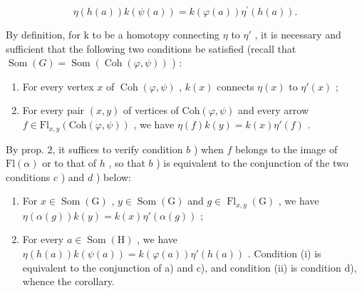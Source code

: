 \[
\eta (h (a)) k (\psi (a)) = k (\varphi (a)) \eta^ {\prime} (h (a)).
\]

By definition, for k to be a homotopy connecting \(\eta\) to \(\eta'\) , it is necessary and sufficient that the following two conditions be satisfied (recall that \(\operatorname{Som}(G) = \operatorname{Som}(\operatorname{Coh}(\varphi, \psi))\) ) :

\begin{enumerate}
\def\labelenumi{\alph{enumi})}
\item
  For every vertex \(x\) of \(\operatorname{Coh}(\varphi, \psi)\) , \(k(x)\) connects \(\eta(x)\) to \(\eta'(x)\) ;
\item
  For every pair \((x,y)\) of vertices of \(\mathrm{Coh}(\varphi,\psi)\) and every arrow \(f\in\mathrm{Fl}_{x,y}(\mathrm{Coh}(\varphi,\psi))\) , we have \(\eta(f)k(y)=k(x)\eta'(f)\) .
\end{enumerate}

By prop. 2, it suffices to verify condition \(b\) ) when \(f\) belongs to the image of \(\mathrm{Fl}(\alpha)\) or to that of \(h\) , so that \(b\) ) is equivalent to the conjunction of the two conditions \(c\) ) and \(d\) ) below:

\begin{enumerate}
\def\labelenumi{\alph{enumi})}
\setcounter{enumi}{2}
\item
  For \(x \in \operatorname{Som}(\mathrm{G})\) , \(y \in \operatorname{Som}(\mathrm{G})\) and \(g \in \operatorname{Fl}_{x,y}(\mathrm{G})\) , we have \(\eta(\alpha(g))k(y) = k(x)\eta'(\alpha(g))\) ;
\item
  For every \(a \in \operatorname{Som}(\mathrm{H})\) , we have \(\eta(h(a))k(\psi(a)) = k(\varphi(a))\eta'(h(a))\) . Condition (i) is equivalent to the conjunction of a) and c), and condition (ii) is condition d), whence the corollary.
\end{enumerate}

